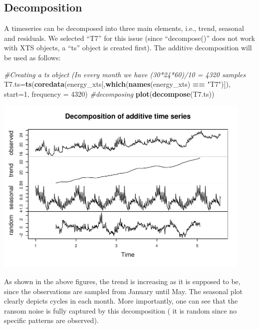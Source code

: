 \documentclass[]{article}
\newenvironment{Shaded}{\begin{snugshade}}{\end{snugshade}}
\newcommand{\KeywordTok}[1]{\textcolor[rgb]{0.13,0.29,0.53}{\textbf{#1}}}
\newcommand{\DataTypeTok}[1]{\textcolor[rgb]{0.13,0.29,0.53}{#1}}
\newcommand{\DecValTok}[1]{\textcolor[rgb]{0.00,0.00,0.81}{#1}}
\newcommand{\StringTok}[1]{\textcolor[rgb]{0.31,0.60,0.02}{#1}}
\newcommand{\CommentTok}[1]{\textcolor[rgb]{0.56,0.35,0.01}{\textit{#1}}}
\newcommand{\OperatorTok}[1]{\textcolor[rgb]{0.81,0.36,0.00}{\textbf{#1}}}
\newcommand{\NormalTok}[1]{#1}
\begin{document}
\subsection{Decomposition}\label{decomposition}

A timeseries can be decomposed into three main elements, i.e., trend,
seasonal and residuals. We selected ``T7'' for this issue (since
``decompose()'' does not work with XTS objects, a ``ts'' object is
created first). The additive decomposition will be used as follows:

\begin{Shaded}
\begin{Highlighting}[]
\CommentTok{#Creating a ts object (In every month we have (30*24*60)/10 = 4320 samples}
\NormalTok{T7.ts=}\KeywordTok{ts}\NormalTok{(}\KeywordTok{coredata}\NormalTok{(energy_xts[,}\KeywordTok{which}\NormalTok{(}\KeywordTok{names}\NormalTok{(energy_xts) }\OperatorTok{==}\StringTok{ "T7"}\NormalTok{)]), }\DataTypeTok{start=}\DecValTok{1}\NormalTok{, }\DataTypeTok{frequency =} \DecValTok{4320}\NormalTok{)}
\CommentTok{#decomposing}
\KeywordTok{plot}\NormalTok{(}\KeywordTok{decompose}\NormalTok{(T7.ts))}
\end{Highlighting}
\end{Shaded}

\includegraphics[width=468]{README_figs/README-unnamed-chunk-12-1}

As shown in the above figures, the trend is increasing as it is supposed
to be, since the observations are sampled from January until May. The
seasonal plot clearly depicts cycles in each month. More importantly,
one can see that the ransom noise is fully captured by this
decomposition ( it is random since no specific patterns are observed).
\end{document}
